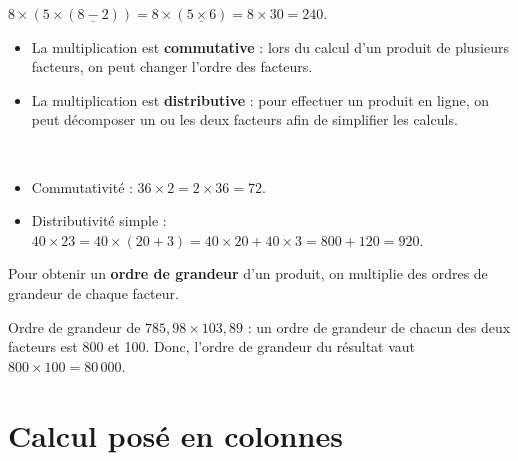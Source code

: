 \begin{exemple*1}
   $8\times(5\times(\underline{8-2})) =8\times(\underline{5\times6}) =8\times30 =240$.
\end{exemple*1}

\medskip

\begin{propriete}
   \begin{itemize}
      \item La multiplication est {\bf commutative} : lors du calcul d’un produit de plusieurs facteurs, on peut changer l’ordre des facteurs.
      \item La multiplication est {\bf distributive} : pour effectuer un produit en ligne, on peut décomposer un ou les deux facteurs afin de simplifier les calculs. 
   \end{itemize}
   \ \\ [-14mm]
\end{propriete}

\begin{exemple*1}
   \begin{itemize}
      \item Commutativité : $36\times2 =2\times36 =72$.
      \item Distributivité simple : $40\times23 =40\times(20+3)=40\times20+40\times3 =800+120 =920$.
   \end{itemize}
\end{exemple*1}

\begin{propriete}
   Pour obtenir un \textbf{ordre de grandeur} d'un produit, on multiplie des ordres de grandeur de chaque facteur.
\end{propriete}

\begin{exemple*1}
   Ordre de grandeur de $785, 98\times 103,89$ : un ordre de grandeur de chacun des deux facteurs est 800 et 100. Donc, l'ordre de grandeur du résultat vaut $800\times100 =80\,000$.
\end{exemple*1}


\section{Calcul posé en colonnes}


